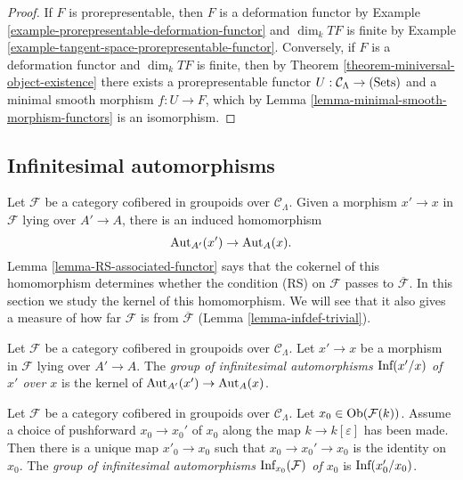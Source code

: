 \begin{proof}
If $F$ is prorepresentable, then $F$ is a deformation functor by Example 
\ref{example-prorepresentable-deformation-functor} and $\dim_k TF$ is finite by 
Example \ref{example-tangent-space-prorepresentable-functor}.  Conversely, if 
$F$ is a deformation functor and $\dim_k TF$ is finite, then by Theorem 
\ref{theorem-miniversal-object-existence} there exists a prorepresentable 
functor $U: \mathcal C_{\Lambda} \rightarrow \textnormal{(Sets)}$ and a minimal 
smooth morphism $f: U \rightarrow F$, which by Lemma 
\ref{lemma-minimal-smooth-morphism-functors} is an isomorphism.
\end{proof}

\subsection{Infinitesimal automorphisms}
\label{subsection-infinitesimal-automorphisms}
Let $\mathcal F$ be a category cofibered in groupoids over $\mathcal 
C_{\Lambda}$. Given a morphism $x' \rightarrow x$ in $\mathcal F$ lying over 
$A' \rightarrow A$, there is an induced homomorphism
\[ \textnormal{Aut}_{A'}(x') \rightarrow \textnormal{Aut}_{A}(x). \]
Lemma \ref{lemma-RS-associated-functor} says that the cokernel of this 
homomorphism determines whether the condition (RS) on $\mathcal F$ passes to 
$\overline{\mathcal F}$. In this section we study the kernel of this 
homomorphism. We will see that it also gives a measure of how far $\mathcal F$ 
is from $\overline{\mathcal F}$ (Lemma \ref{lemma-infdef-trivial}).  

\begin{definition}
Let $\mathcal F$ be a category cofibered in groupoids over $\mathcal 
C_{\Lambda}$. Let $x' \rightarrow x$ be a morphism in $\mathcal F$ lying over 
$A' \rightarrow A$. The \emph{group of infinitesimal automorphisms 
$\textnormal{Inf}({x'/x})$ of $x'$ over $x$} is the kernel of 
$\textnormal{Aut}_{A'}(x') \rightarrow \textnormal{Aut}_{A}(x)$.
\end{definition}

\begin{definition}
Let $\mathcal F$ be a category cofibered in groupoids over $\mathcal 
C_{\Lambda}$. Let $x_0 \in \textnormal{Ob}(\mathcal F(k))$. Assume a choice of 
pushforward $x_0 \rightarrow x_0'$ of $x_0$ along the map $k \rightarrow 
k[\varepsilon]$ has been made.  Then there is a unique map $x'_0 \rightarrow 
x_0$ such that $x_0 \rightarrow x_0' \rightarrow x_0$ is the identity on $x_0$. 
The \emph{group of infinitesimal automorphisms $\textnormal{Inf}_{x_0}(\mathcal 
F)$ of $x_0$} is $\textnormal{Inf}(x'_0/x_0)$.
\end{definition}

